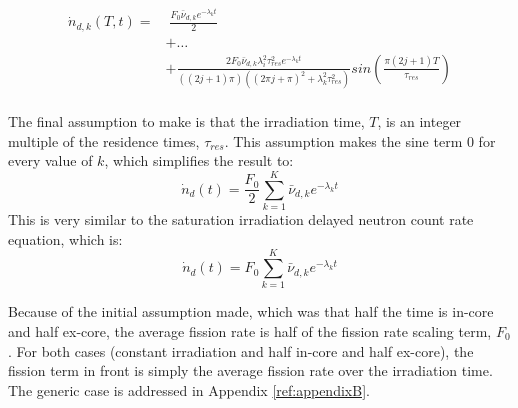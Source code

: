 \begin{equation}
\begin{split}
    \dot{n}_{d, k}(T, t) =& \; \frac{F_0 \bar{\nu}_{d, k} e^{-\lambda_k t}}{2}\\
    & + \dots\\
    & + \frac{2 F_0 \bar{\nu}_{d, k} \lambda_i^2 \tau_{res}^2 e^{-\lambda_k t} }{\left( (2j+1) \pi \right) \left( (2 \pi j + \pi)^2 + \lambda_k^2 \tau_{res}^2 \right)} sin\left( \frac{\pi (2j+1) T}{\tau_{res}} \right)\\
    \label{eq:split-integral-solved-reduced}
\end{split}
\end{equation}

The final assumption to make is that the irradiation time, $T$, is an integer multiple of the residence times, $\tau_{res}$.
This assumption makes the sine term 0 for every value of $k$, which simplifies the result to:
\begin{equation}
    \dot{n}_{d}(t) = \frac{F_0}{2} \sum_{k=1}^{K} \bar{\nu}_{d, k} e^{-\lambda_k t}
    \label{eq:fully-resolved-flow-irrad}
\end{equation}
This is very similar to the saturation irradiation delayed neutron count rate equation, which is:
\begin{equation}
    \dot{n}_{d}(t) = F_0 \sum_{k=1}^{K} \bar{\nu}_{d, k} e^{-\lambda_k t}
    \label{eq:saturation-count-eqn}
\end{equation}

Because of the initial assumption made, which was that half the time is in-core and half ex-core, the average fission rate is half of the fission rate scaling term, $F_0$.
For both cases (constant irradiation and half in-core and half ex-core), the fission term in front is simply the average fission rate over the irradiation time.
The generic case is addressed in Appendix \ref{ref:appendixB}.

